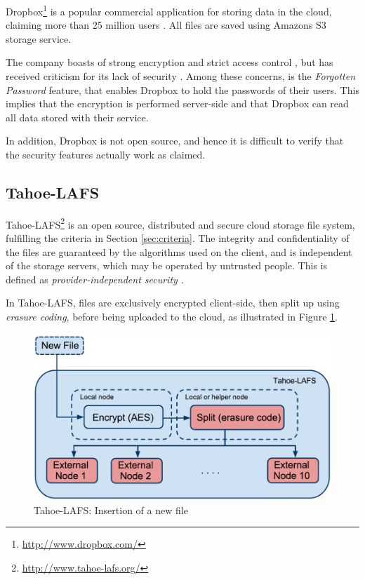 \documentclass[pdftex,english,10pt,b5paper,twoside]{book}
\begin{document}
Dropbox\footnote{\url{http://www.dropbox.com/}} is a popular commercial
application for storing data in the cloud, claiming more than 25 million users
\cite{dropbox_users}. All files are saved using Amazons S3 storage service.

The company boasts of strong encryption and strict access control
\cite{dropbox_security}, but has received criticism for its lack of security
\cite{dropbox_concerns}. Among these concerns, is the \emph{Forgotten Password}
feature, that enables Dropbox to hold the passwords of their users. This
implies that the encryption is performed server-side and that Dropbox can read
all data stored with their service.

In addition, Dropbox is not open source, and hence it is difficult to verify
that the security features actually work as claimed.

\subsection{Tahoe-LAFS}
\label{sec:tahoe}

Tahoe-\ac{LAFS}\footnote{\url{http://www.tahoe-lafs.org/}} is an open source,
distributed and secure cloud storage file system, fulfilling the criteria in
Section \ref{sec:criteria}. The integrity and confidentiality of the
files are guaranteed by the algorithms used on the client, and is independent
of the storage servers, which may be operated by untrusted people.
This is defined as \emph{provider-independent security} \cite{tahoe}.

In Tahoe-\ac{LAFS}, files are exclusively encrypted client-side, then split up
using \emph{erasure coding}, before being uploaded to the cloud, as illustrated
in Figure \ref{fig:B:tahoe}.

\begin{figure}[h!]
    \centering
    \includegraphics[width=\columnwidth]{Tahoe-newfile.pdf}
    \caption{Tahoe-LAFS: Insertion of a new file}
    \label{fig:B:tahoe}
\end{figure}
\end{document}
